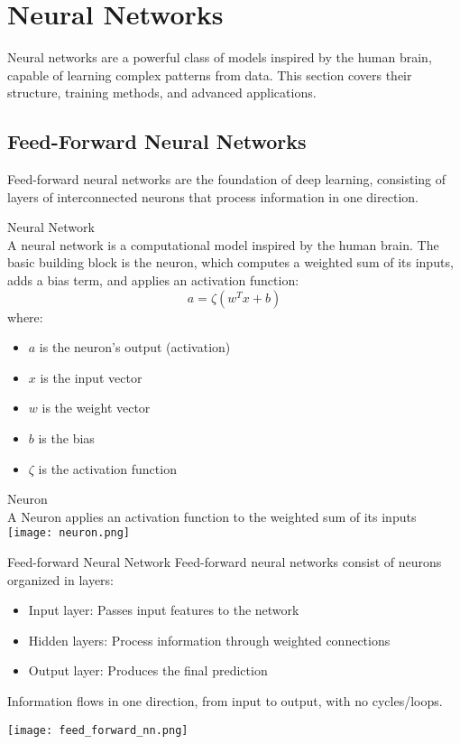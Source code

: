 \section{Neural Networks}

Neural networks are a powerful class of models inspired by the human brain, capable of learning complex patterns from data. This section covers their structure, training methods, and advanced applications.

\subsection{Feed-Forward Neural Networks}

Feed-forward neural networks are the foundation of deep learning, consisting of layers of interconnected neurons that process information in one direction.


\begin{definition}{Neural Network}\\
A neural network is a computational model inspired by the human brain. The basic building block is the neuron, which computes a weighted sum of its inputs, adds a bias term, and applies an activation function:
\[a = \zeta(w^T x + b)\]
where:
\begin{itemize}
    \item $a$ is the neuron's output (activation)
    \item $x$ is the input vector
    \item $w$ is the weight vector
    \item $b$ is the bias
    \item $\zeta$ is the activation function
\end{itemize}
\end{definition}

\begin{definition}{Neuron}\\
    A Neuron applies an activation function to the weighted sum of its inputs\\
    \texttt{[image: neuron.png]}
\end{definition}

\multend

\begin{definition}{Feed-forward Neural Network}
Feed-forward neural networks consist of neurons organized in layers:
\begin{itemize}
    \item Input layer: Passes input features to the network
    \item Hidden layers: Process information through weighted connections
    \item Output layer: Produces the final prediction
\end{itemize}
Information flows in one direction, from input to output, with no cycles/loops.

\texttt{[image: feed\_forward\_nn.png]}
\end{definition}

